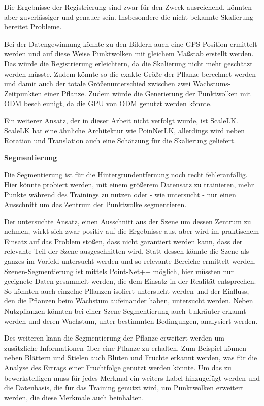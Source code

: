 \documentclass[12pt,titlepage, twoside]{article}
\begin{document}
Die Ergebnisse der Registrierung sind zwar für den Zweck ausreichend, könnten aber zuverlässiger und genauer sein. Insbesondere die nicht bekannte Skalierung bereitet Probleme.

Bei der Datengewinnung könnte zu den Bildern auch eine GPS-Position ermittelt werden und auf diese Weise Punktwolken mit gleichem Maßstab erstellt werden. 
Das würde die Registrierung erleichtern, da die Skalierung nicht mehr geschätzt werden müsste.
Zudem könnte so die exakte Größe der Pflanze berechnet werden und damit auch der totale Größenunterschied zwischen zwei Wachstums-Zeitpunkten einer Pflanze.
Zudem würde die Generierung der Punktwolken mit ODM beschleunigt, da die GPU von ODM genutzt werden könnte.

Ein weiterer Ansatz, der in dieser Arbeit nicht verfolgt wurde, ist ScaleLK. 
ScaleLK hat eine ähnliche Architektur wie PoinNetLK, allerdings wird neben Rotation und Translation auch eine Schätzung für die Skalierung geliefert.

\textbf{Segmentierung}

Die Segmentierung ist für die Hintergrundentfernung noch recht fehleranfällig. Hier könnte probiert werden, mit einem größerem Datensatz zu trainieren, 
mehr Punkte während des Trainings zu nutzen oder - wie untersucht - nur einen Ausschnitt um das Zentrum der Punktwolke segmentieren.

Der untersuchte Ansatz, einen Ausschnitt aus der Szene um dessen Zentrum zu nehmen, wirkt sich zwar positiv auf die Ergebnisse aus, aber wird im praktischem Einsatz auf das Problem stoßen, 
dass nicht garantiert werden kann, dass der relevante Teil der Szene ausgeschnitten wird.
Statt dessen könnte die Szene als ganzes im Vorfeld untersucht werden und so relevante Bereiche ermittelt werden. 
Szenen-Segmentierung ist mittels Point-Net++ möglich, hier müssten nur geeignete Daten gesammelt werden, die dem Einsatz in der Realität entsprechen. 
So könnten auch einzelne Pflanzen isoliert untersucht werden und der Einfluss, den die Pflanzen beim Wachstum aufeinander haben, untersucht werden.
Neben Nutzpflanzen könnten bei einer Szene-Segmentierung auch Unkräuter erkannt werden und deren Wachstum, unter bestimmten Bedingungen, analysiert werden.

Des weiteren kann die Segmentierung der Pflanze erweitert werden um zusätzliche Informationen über eine Pflanze zu erhalten. 
Zum Beispiel können neben Blättern und Stielen auch Blüten und Früchte erkannt werden, was für die Analyse des Ertrags einer Fruchtfolge genutzt werden könnte.
Um das zu bewerkstelligen muss für jedes Merkmal ein weiters Label hinzugefügt werden und die Datenbasis, die für das Training genutzt wird, um Punktwolken erweitert werden, die diese Merkmale auch beinhalten.
\end{document}
